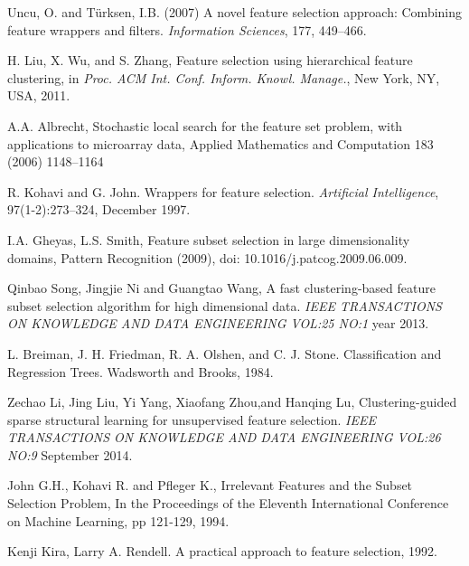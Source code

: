 \documentclass[a4paper,11pt]{article}
\begin{document}

\begin{thebibliography}{}

Uncu, O. and T\"urksen, I.B. (2007) A novel feature selection
approach: Combining feature wrappers and filters. \textit{Information Sciences}, 177, 449--466.

H. Liu, X. Wu, and S. Zhang, Feature selection using hierarchical feature clustering, in \textit{Proc. ACM Int. Conf. Inform. Knowl. Manage.}, New York, NY, USA, 2011.

A.A. Albrecht, Stochastic local search for the feature set problem, with applications to microarray data, Applied Mathematics and Computation 183 (2006) 1148–1164

R. Kohavi and G. John. Wrappers for feature selection. \textit{Artificial Intelligence}, 97(1-2):273–324,
December 1997.

I.A. Gheyas, L.S. Smith, Feature subset selection in large dimensionality domains, Pattern Recognition (2009), doi:
10.1016/j.patcog.2009.06.009.

Qinbao Song, Jingjie Ni and Guangtao Wang, A fast clustering-based feature subset selection algorithm for high dimensional data. \textit{IEEE TRANSACTIONS ON KNOWLEDGE AND DATA ENGINEERING VOL:25 NO:1} year 2013.

L. Breiman, J. H. Friedman, R. A. Olshen, and C. J. Stone. Classification and Regression Trees. Wadsworth and Brooks, 1984.

Zechao Li, Jing Liu, Yi Yang, Xiaofang Zhou,and Hanqing Lu, Clustering-guided sparse structural learning
for unsupervised feature selection. \textit{IEEE TRANSACTIONS ON KNOWLEDGE AND DATA ENGINEERING VOL:26 NO:9} September 2014.

John G.H., Kohavi R. and Pfleger K., Irrelevant Features and the Subset Selection Problem, In the Proceedings of the Eleventh International Conference on Machine Learning, pp 121-129, 1994.

Kenji Kira, Larry A. Rendell. A practical approach to feature selection, 1992.


\end{thebibliography}
\end{document}
